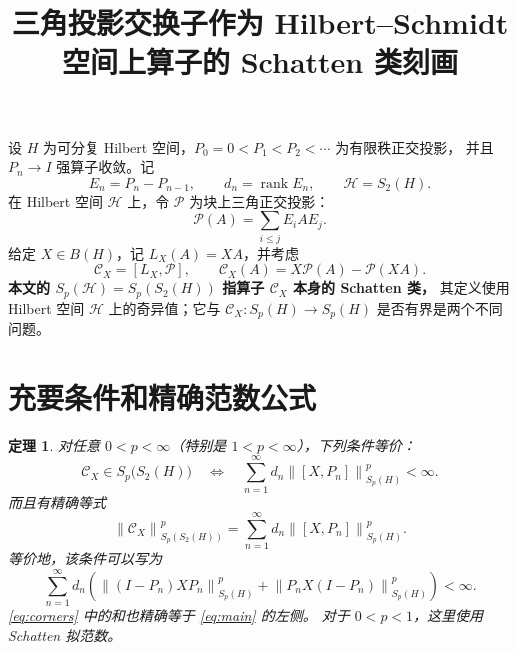 \documentclass[UTF8,11pt,a4paper,fontset=fandol]{ctexart}
\title{三角投影交换子作为 Hilbert--Schmidt 空间上算子的 Schatten 类刻画}
\author{}
\date{}
\newtheorem{theorem}{定理}
\theoremstyle{remark}
\newcommand{\PP}{\mathcal P}
\newcommand{\CC}{\mathcal C}
\newcommand{\HH}{\mathcal H}
\newcommand{\rank}{\operatorname{rank}}
\newcommand{\norm}[1]{\left\lVert #1\right\rVert}
\begin{document}
\maketitle
\vspace{-2em}

设 $H$ 为可分复 Hilbert 空间，$P_0=0<P_1<P_2<\cdots$ 为有限秩正交投影，
并且 $P_n\to I$ 强算子收敛。记
\[
 E_n=P_n-P_{n-1},\qquad d_n=\rank E_n,\qquad \HH=S_2(H).
\]
在 Hilbert 空间 $\HH$ 上，令 $\PP$ 为块上三角正交投影：
\[
 \PP(A)=\sum_{i\leq j}E_iAE_j.
\]
给定 $X\in B(H)$，记 $L_X(A)=XA$，并考虑
\[
 \CC_X=[L_X,\PP],\qquad
 \CC_X(A)=X\PP(A)-\PP(XA).
\]
\textbf{本文的 $S_p(\HH)=S_p(S_2(H))$ 指算子 $\CC_X$ 本身的 Schatten 类，}
其定义使用 Hilbert 空间 $\HH$ 上的奇异值；它与 $\CC_X:S_p(H)\to S_p(H)$
是否有界是两个不同问题。

\section*{充要条件和精确范数公式}

\begin{theorem}\label{thm:main}
对任意 $0<p<\infty$（特别是 $1<p<\infty$），下列条件等价：
\[
 \boxed{\quad
 \CC_X\in S_p\bigl(S_2(H)\bigr)
 \quad\Longleftrightarrow\quad
 \sum_{n=1}^{\infty}d_n\norm{[X,P_n]}_{S_p(H)}^p<\infty.
 \quad}
\]
而且有精确等式
\begin{equation}\label{eq:main}
 \norm{\CC_X}_{S_p(S_2(H))}^p
 =\sum_{n=1}^{\infty}d_n\norm{[X,P_n]}_{S_p(H)}^p.
\end{equation}
等价地，该条件可以写为
\begin{equation}\label{eq:corners}
 \boxed{\quad
 \sum_{n=1}^{\infty}d_n\left(
 \norm{(I-P_n)XP_n}_{S_p(H)}^p
 +\norm{P_nX(I-P_n)}_{S_p(H)}^p\right)<\infty.
 \quad}
\end{equation}
\eqref{eq:corners} 中的和也精确等于 \eqref{eq:main} 的左侧。
对于 $0<p<1$，这里使用 Schatten 拟范数。
\end{theorem}
\end{document}
